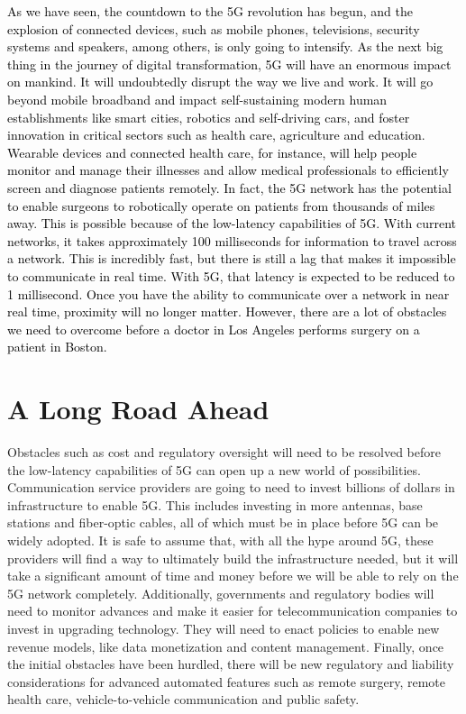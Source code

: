 \textcolor{black}{As we have seen, the countdown to the 5G revolution has begun, and the explosion of connected devices, such as mobile phones, televisions, security systems and speakers, among others, is only going to intensify. As the next big thing in the journey of digital transformation, 5G will have an enormous impact on mankind. It will undoubtedly disrupt the way we live and work. It will go beyond mobile broadband and impact self-sustaining modern human establishments like smart cities, robotics and self-driving cars, and foster innovation in critical sectors such as health care, agriculture and education. Wearable devices and connected health care, for instance, will help people monitor and manage their illnesses and allow medical professionals to efficiently screen and diagnose patients remotely. In fact, the 5G network has the potential to enable surgeons to robotically operate on patients from thousands of miles away. This is possible because of the low-latency capabilities of 5G. With current networks, it takes approximately 100 milliseconds for information to travel across a network. This is incredibly fast, but there is still a lag that makes it impossible to communicate in real time. With 5G, that latency is expected to be reduced to 1 millisecond. Once you have the ability to communicate over a network in near real time, proximity will no longer matter. However, there are a lot of obstacles we need to overcome before a doctor in Los Angeles performs surgery on a patient in Boston.}

\section{A Long Road Ahead}
Obstacles such as cost and regulatory oversight will need to be resolved before the low-latency capabilities of 5G can open up a new world of possibilities. Communication service providers are going to need to invest billions of dollars in infrastructure to enable 5G. This includes investing in more antennas, base stations and fiber-optic cables, all of which must be in place before 5G can be widely adopted. It is safe to assume that, with all the hype around 5G, these providers will find a way to ultimately build the infrastructure needed, but it will take a significant amount of time and money before we will be able to rely on the 5G network completely. Additionally, governments and regulatory bodies will need to monitor advances and make it easier for telecommunication companies to invest in upgrading technology. They will need to enact policies to enable new revenue models, like data monetization and content management. Finally, once the initial obstacles have been hurdled, there will be new regulatory and liability considerations for advanced automated features such as remote surgery, remote health care, vehicle-to-vehicle communication and public safety.
